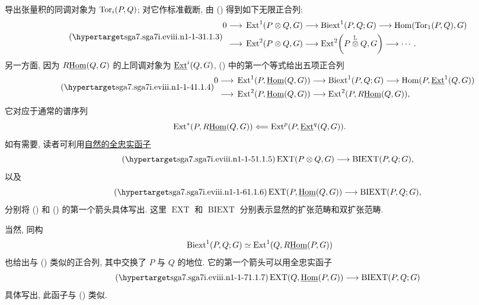 导出张量积的同调对象为 $\operatorname{Tor}_i(P,Q)$; 对它作标准截断, 由 () 得到如下无限正合列:
\begin{equation}\tag{\SGARefTarget{sga7.sga7i.eviii.n1-1-3}{1.1.3}}
\begin{aligned}
0\longrightarrow{}&
 \Ext^1(P\otimes Q,G)
 \longrightarrow \Biext^1(P,Q;G)
 \longrightarrow \Hom(\Tor_1(P,Q),G)\\
 \longrightarrow{}&
 \Ext^2(P\otimes Q,G)
 \longrightarrow
 \Ext^2\!\left(P\mathbin{\overset{\mathbb L}{\otimes}}Q,G\right)
 \longrightarrow\cdots .
\end{aligned}
\end{equation}
另一方面, 因为 $R\uHom(Q,G)$ 的上同调对象为 $\uExt^i(Q,G)$, () 中的第一个等式给出五项正合列
\begin{equation}\tag{\SGARefTarget{sga7.sga7i.eviii.n1-1-4}{1.1.4}}
\begin{aligned}
0\longrightarrow{}&
 \Ext^1(P,\uHom(Q,G))
 \longrightarrow \Biext^1(P,Q;G)
 \longrightarrow \Hom(P,\uExt^1(Q,G))\\
 \longrightarrow{}&
 \Ext^2(P,\uHom(Q,G))
 \longrightarrow \Ext^2(P,R\uHom(Q,G)),
\end{aligned}
\end{equation}
它对应于通常的谱序列
\[
 \Ext^*(P,R\uHom(Q,G))
 \Longleftarrow
 \Ext^p(P,\uExt^q(Q,G)).
\]
如有需要, 读者可利用\underline{自然的全忠实函子}
\begin{equation}\tag{\SGARefTarget{sga7.sga7i.eviii.n1-1-5}{1.1.5}}
 \operatorname{EXT}(P\otimes Q,G)
 \longrightarrow
 \operatorname{BIEXT}(P,Q;G),
\end{equation}
以及
\begin{equation}\tag{\SGARefTarget{sga7.sga7i.eviii.n1-1-6}{1.1.6}}
 \operatorname{EXT}(P,\uHom(Q,G))
 \longrightarrow
 \operatorname{BIEXT}(P,Q;G),
\end{equation}
分别将 () 和 () 的第一个箭头具体写出. 这里 $\operatorname{EXT}$ 和 $\operatorname{BIEXT}$ 分别表示显然的扩张范畴和双扩张范畴.

当然, 同构
\[
 \Biext^1(P,Q;G)\simeq\Ext^1(Q,R\uHom(P,G))
\]
也给出与 () 类似的正合列, 其中交换了 $P$ 与 $Q$ 的地位. 它的第一个箭头可以用全忠实函子
\begin{equation}\tag{\SGARefTarget{sga7.sga7i.eviii.n1-1-7}{1.1.7}}
 \operatorname{EXT}(Q,\uHom(P,G))
 \longrightarrow
 \operatorname{BIEXT}(P,Q;G)
\end{equation}
具体写出, 此函子与 () 类似.

